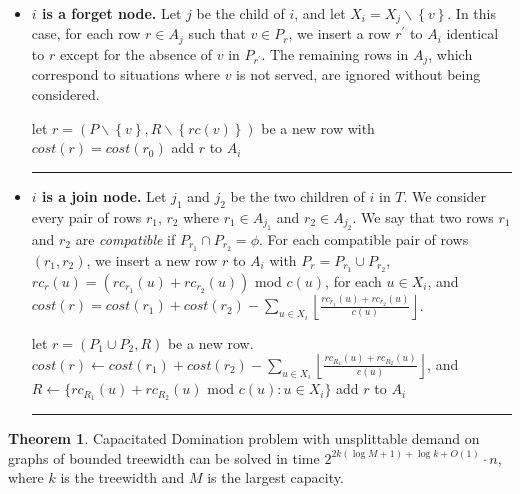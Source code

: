 \documentclass[a4paper,11pt]{article}
\theoremstyle{definition}
\newtheorem{theorem}{Theorem}
\begin{document}
\begin{itemize}
\item{\bf $i$ is a forget node.} Let $j$ be the child of $i$, and let $X_i = X_j \backslash \left\{v\right\}$. In this case, for each row $r \in A_{j}$ such that $v\in P_r$, we insert a row $r^\prime$ to $A_i$ identical to $r$ except for the absence of $v$ in $P_{r^\prime}$. The remaining rows in $A_j$, which correspond to situations where $v$ is not served, are ignored without being considered.

\smallskip

\begin{algorithmic}[1]
	\STATE let $r = (P \backslash \left\{v\right\}, R \backslash \left\{rc(v)\right\})$ be a new row with $cost(r) = cost(r_0)$
	\STATE add $r$ to $A_i$
\ENDFOR
\newline \rule{\linewidth}{0.2mm}
\end{algorithmic}

\item{\bf $i$ is a join node.} Let $j_1$ and $j_2$ be the two children of $i$ in $T$. We consider every pair of rows $r_1$, $r_2$ where $r_1 \in A_{j_1}$ and $r_2 \in A_{j_2}$. We say that two rows $r_1$ and $r_2$ are {\em compatible} if $P_{r_1} \cap P_{r_2} = \phi$. For each compatible pair of rows $\left(r_1,r_2\right)$, we insert a new row $r$ to $A_i$ with $P_r = P_{r_1} \cup P_{r_2}$, $rc_r(u) = \left(rc_{r_1}(u)+rc_{r_2}(u)\right)$ mod $c(u)$, for each $u \in X_i$, and $cost(r) = cost(r_1)+cost(r_2) - \sum_{u \in X_i}\left\lfloor\frac{rc_{r_1}(u)+rc_{r_2}(u)}{c(u)}\right\rfloor$.

\smallskip

\begin{algorithmic}[1]
	\STATE let $r = \left(P_1 \cup P_2, R \right)$ be a new row.
	\STATE $cost(r) \longleftarrow cost(r_1) + cost(r_2) - \sum_{u \in X_i}\left\lfloor\frac{rc_{R_1}(u) + rc_{R_2}(u)}{c(u)}\right\rfloor$, and
	\STATE $R \longleftarrow \{ rc_{R_1}(u) + rc_{R_2}(u)$ mod $c(u) : u \in X_i\}$
	\STATE add $r$ to $A_i$
\ENDFOR
\newline \rule{\linewidth}{0.2mm}
\end{algorithmic}

\end{itemize}

\begin{theorem}
Capacitated Domination problem with unsplittable demand on graphs of bounded treewidth can be solved in time $2^{2k(\log M +1)+\log k+O(1)}\cdot n$, where $k$ is the treewidth and $M$ is the largest capacity.
\end{theorem}
\end{document}
